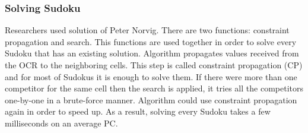 \documentclass[../../main]{subfiles}
\begin{document}
\subsubsection{Solving Sudoku} 

Researchers used solution of Peter Norvig. There are two functions: constraint propagation and search. This functions are used together in order to solve every Sudoku that has an existing solution. Algorithm propagates values received from the OCR to the neighboring cells. This step is called constraint propagation (CP) and for most of Sudokus it is enough to solve them. If there were more than one competitor for the same cell then the search is applied, it tries all the competitors one-by-one in a brute-force manner. Algorithm could use constraint propagation again in order to speed up. As a result, solving every Sudoku takes a few milliseconds on an average PC.
\end{document}
